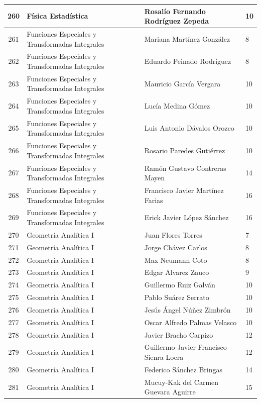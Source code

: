 {\begin{longtable}{|c|p{6.5cm}|p{5cm}|p{1.5cm}|}
  260 & Física Estadística & Rosalío Fernando Rodríguez Zepeda & 10 \\ \hline
  261 & Funciones Especiales y Transformadas Integrales & Mariana Martínez González & 8 \\ \hline
  262 & Funciones Especiales y Transformadas Integrales & Eduardo Peinado Rodríguez & 8 \\ \hline
  263 & Funciones Especiales y Transformadas Integrales & Mauricio García Vergara & 10 \\ \hline
  264 & Funciones Especiales y Transformadas Integrales & Lucía Medina Gómez & 10 \\ \hline
  265 & Funciones Especiales y Transformadas Integrales & Luis Antonio Dávalos Orozco & 10 \\ \hline
  266 & Funciones Especiales y Transformadas Integrales & Rosario Paredes Gutiérrez & 10 \\ \hline
  267 & Funciones Especiales y Transformadas Integrales & Ramón Gustavo Contreras Mayen & 14 \\ \hline
  268 & Funciones Especiales y Transformadas Integrales & Francisco Javier Martínez Farias & 16 \\ \hline
  269 & Funciones Especiales y Transformadas Integrales & Erick Javier López Sánchez & 16 \\ \hline
  270 & Geometría Analítica I & Juan Flores Torres & 7 \\ \hline
  271 & Geometría Analítica I & Jorge Chávez Carlos & 8 \\ \hline
  272 & Geometría Analítica I & Max Neumann Coto & 8 \\ \hline
  273 & Geometría Analítica I & Edgar Alvarez Zauco & 9 \\ \hline
  274 & Geometría Analítica I & Guillermo Ruiz Galván & 10 \\ \hline
  275 & Geometría Analítica I & Pablo Suárez Serrato & 10 \\ \hline
  276 & Geometría Analítica I & Jesús Ángel Núñez Zimbrón & 10 \\ \hline
  277 & Geometría Analítica I & Oscar Alfredo Palmas Velasco & 10 \\ \hline
  278 & Geometría Analítica I & Javier Bracho Carpizo & 12 \\ \hline
  279 & Geometría Analítica I & Guillermo Javier Francisco Sienra Loera & 12 \\ \hline
  280 & Geometría Analítica I & Federico Sánchez Bringas & 14 \\ \hline
  281 & Geometría Analítica I & Mucuy-Kak del Carmen Guevara Aguirre & 15 \\ \hline

\end{longtable}}
